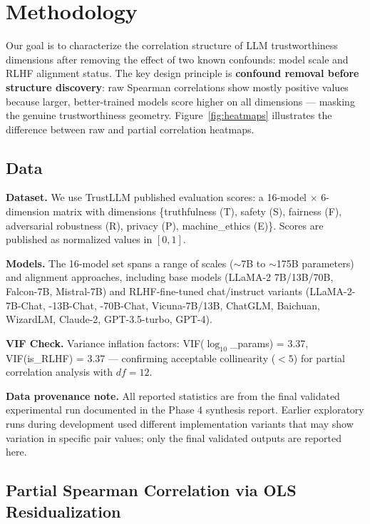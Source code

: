 \section{Methodology}
\label{sec:method}

Our goal is to characterize the correlation structure of LLM trustworthiness dimensions after removing the effect of two known confounds: model scale and RLHF alignment status. The key design principle is \textbf{confound removal before structure discovery}: raw Spearman correlations show mostly positive values because larger, better-trained models score higher on all dimensions --- masking the genuine trustworthiness geometry. Figure~\ref{fig:heatmaps} illustrates the difference between raw and partial correlation heatmaps.

\subsection{Data}

\textbf{Dataset.} We use TrustLLM \cite{sun2024trustllm} published evaluation scores: a 16-model $\times$ 6-dimension matrix with dimensions \{truthfulness (T), safety (S), fairness (F), adversarial robustness (R), privacy (P), machine\_ethics (E)\}. Scores are published as normalized values in $[0, 1]$.

\textbf{Models.} The 16-model set spans a range of scales ($\sim$7B to $\sim$175B parameters) and alignment approaches, including base models (LLaMA-2 7B/13B/70B, Falcon-7B, Mistral-7B) and RLHF-fine-tuned chat/instruct variants (LLaMA-2-7B-Chat, -13B-Chat, -70B-Chat, Vicuna-7B/13B, ChatGLM, Baichuan, WizardLM, Claude-2, GPT-3.5-turbo, GPT-4).

\textbf{VIF Check.} Variance inflation factors: VIF($\log_{10}$\_params) = 3.37, VIF(is\_RLHF) = 3.37 --- confirming acceptable collinearity ($< 5$) for partial correlation analysis with $df = 12$.

\textbf{Data provenance note.} All reported statistics are from the final validated experimental run documented in the Phase 4 synthesis report. Earlier exploratory runs during development used different implementation variants that may show variation in specific pair values; only the final validated outputs are reported here.

\subsection{Partial Spearman Correlation via OLS Residualization}

